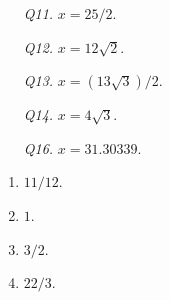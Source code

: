 \documentclass[12pt]{article} %
\theoremstyle{ex}
\begin{document}
\begin{qstn} \text{ }
  \begin{itemize} 
    \item[\textit{Q11.}] $x = 25 / 2$.

    \item[\textit{Q12.}] $x = 12\sqrt{2}$.

    \item[\textit{Q13.}] $x = (13\sqrt{3})/ 2$.

    \item[\textit{Q14.}] $x = 4\sqrt{3}$.

    \item[\textit{Q16.}] $x = 31.30339$.

  \end{itemize}
\end{qstn}

\newpage

\begin{qstn} \text{ }
  \begin{enumerate}[label=(\alph*)]
    \item $11 / 12$.
    \item $1$. 
    \item $3 / 2$.
    \item $22 / 3$.
  \end{enumerate}
\end{qstn}
\end{document}
